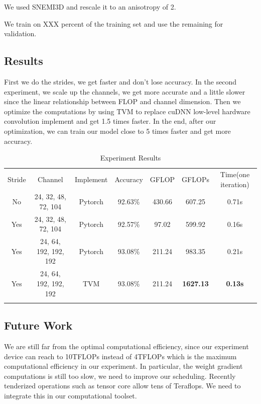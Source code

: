 \documentclass[runningheads]{llncs}
\begin{document}
We used SNEMI3D and rescale it to an anisotropy of 2.

We train on XXX percent of the training set and use the remaining for validation.



\subsection{Results}



First we do the strides, we get faster and don't lose accuracy.
In the second experiment, we scale up the channels, we get more accurate and a little slower since the linear relationship between FLOP and channel dimension.
Then we optimize the computations by using TVM to replace cuDNN low-level hardware convolution implement and get 1.5 times faster.
In the end, after our optimization, we can train our model close to 5 times faster and get more accuracy.

\begin{table}
\centering
\caption{Experiment Results}
\label{tab:1}
\begin{tabular}{ccccccc}
\hline\noalign{\smallskip}
Stride & Channel & Implement & Accuracy & GFLOP & GFLOPs & Time(one iteration)  \\
\noalign{\smallskip}\hline\noalign{\smallskip}
No & 24, 32, 48, 72, 104 & Pytorch & 92.63\% &  430.66 & 607.25 & 0.71s\\
Yes & 24, 32, 48, 72, 104 & Pytorch & 92.57\% &  97.02 & 599.92 & 0.16s\\
Yes & 24, 64, 192, 192, 192 & Pytorch & 93.08\% &  211.24 & 983.35 & 0.21s\\
Yes & 24, 64, 192, 192, 192 & TVM & 93.08\% & 211.24 & \textbf{1627.13} &  \textbf{0.13s}\\
\noalign{\smallskip}\hline
\end{tabular}
\end{table}

\subsection{Future Work}
We are still far from the optimal computational efficiency, since our experiment device can reach to 10TFLOPs instead of 4TFLOPs which is the maximum computational efficiency in our experiment.
In particular, the weight gradient computations is still too slow, we need to improve our scheduling.
Recently tenderized operations such as tensor core allow tens of Teraflops.
We need to integrate this in our computational toolset.
\end{document}

